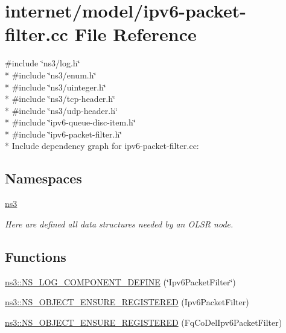 \hypertarget{ipv6-packet-filter_8cc}{}\section{internet/model/ipv6-\/packet-\/filter.cc File Reference}
\label{ipv6-packet-filter_8cc}
{\ttfamily \#include \char`\"{}ns3/log.\+h\char`\"{}}\\*
{\ttfamily \#include \char`\"{}ns3/enum.\+h\char`\"{}}\\*
{\ttfamily \#include \char`\"{}ns3/uinteger.\+h\char`\"{}}\\*
{\ttfamily \#include \char`\"{}ns3/tcp-\/header.\+h\char`\"{}}\\*
{\ttfamily \#include \char`\"{}ns3/udp-\/header.\+h\char`\"{}}\\*
{\ttfamily \#include \char`\"{}ipv6-\/queue-\/disc-\/item.\+h\char`\"{}}\\*
{\ttfamily \#include \char`\"{}ipv6-\/packet-\/filter.\+h\char`\"{}}\\*
Include dependency graph for ipv6-\/packet-\/filter.cc\+:
\subsection*{Namespaces}
\begin{DoxyCompactItemize}
\item 
 \hyperlink{namespacens3}{ns3}
\begin{DoxyCompactList}\small\item\em Here are defined all data structures needed by an O\+L\+SR node. \end{DoxyCompactList}\end{DoxyCompactItemize}
\subsection*{Functions}
\begin{DoxyCompactItemize}
\item 
\hyperlink{namespacens3_a769d8b8347ec3c5379a97e135155b54e}{ns3\+::\+N\+S\+\_\+\+L\+O\+G\+\_\+\+C\+O\+M\+P\+O\+N\+E\+N\+T\+\_\+\+D\+E\+F\+I\+NE} (\char`\"{}Ipv6\+Packet\+Filter\char`\"{})
\item 
\hyperlink{namespacens3_ab6ab7da56fc8de2e227bf85fe8446668}{ns3\+::\+N\+S\+\_\+\+O\+B\+J\+E\+C\+T\+\_\+\+E\+N\+S\+U\+R\+E\+\_\+\+R\+E\+G\+I\+S\+T\+E\+R\+ED} (Ipv6\+Packet\+Filter)
\item 
\hyperlink{namespacens3_a94ec2747cebc0408f8a8b8c67f12782d}{ns3\+::\+N\+S\+\_\+\+O\+B\+J\+E\+C\+T\+\_\+\+E\+N\+S\+U\+R\+E\+\_\+\+R\+E\+G\+I\+S\+T\+E\+R\+ED} (Fq\+Co\+Del\+Ipv6\+Packet\+Filter)
\end{DoxyCompactItemize}
